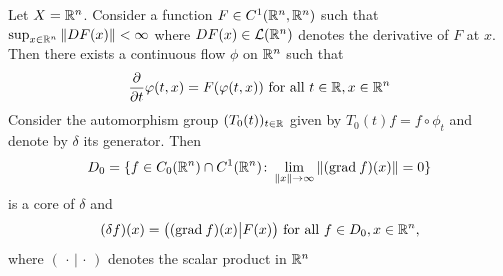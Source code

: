 \begin{example}\label{ex:b2-3.15}
Let $X = \mathbb{R}^{n}$.
Consider a function $F \in C^{1}(\mathbb{R}^{n},\mathbb{R}^{n})$ such that $\sup_{x \in \mathbb{R}^{n}} \|DF(x)\| < \infty$ where $DF(x) \in \mathcal{L}(\mathbb{R}^{n})$ denotes the derivative of\/ $F$ at $x$.
Then there exists a continuous flow $\phi$ on $\mathbb{R}^{n}$ such that
\begin{equation}\label{eq:b2-3.20}
\frac{\partial}{\partial t} \phi(t,x) = F(\phi(t,x)) \text{ for all } t \in \R, x \in \R^{n}
\end{equation}
Consider the automorphism group $(T_{0}(t))_{t \in \mathbb{R}}$ given by $T_{0}(t)f = f \circ \phi_{t}$
and denote by $\delta$ its generator.
Then 
\[D_{0} = \{ f \in C_{0}(\mathbb{R}^{n}) \cap C^{1}(\mathbb{R}^{n}) \colon \lim_{\|x\| \to \infty} \|(\mathrm{grad}\: f)(x)\| = 0 \}
\]
is a core of\/ $\delta$ and
\begin{equation}\label{eq:b2-3.21}
(\delta f)(x) = \big((\mathrm{grad}\: f)(x) \big| F(x)\big) \text{ for all } f \in D_{0}, x \in \mathbb{R}^{n},
\end{equation}
where $(\,\cdot\,|\,\cdot\,)$
denotes the scalar product in $\mathbb{R}^{n}$
\end{example}
